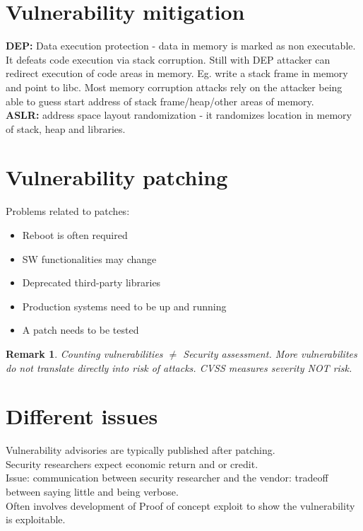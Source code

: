 \documentclass[10pt,a4paper]{book}
\newtheorem{remark}{Remark}
\begin{document}
\section{Vulnerability mitigation}
\textbf{DEP:} Data execution protection - data in memory is marked as non executable. It defeats code execution via stack corruption. Still with DEP attacker can redirect execution of code areas in memory. Eg. write a stack frame in memory and point to libc. Most memory corruption attacks rely on the attacker being able to guess start address of stack frame/heap/other areas of memory.\\
\textbf{ASLR:} address space layout randomization - it randomizes location in memory of stack, heap and libraries.
\section{Vulnerability patching}
Problems related to patches: 
\begin{itemize}
\item Reboot is often required
\item SW functionalities may change
\item Deprecated third-party libraries
\item Production systems need to be up and running
\item A patch needs to be tested
\end{itemize}
\begin{remark}
Counting vulnerabilities $\neq$ Security assessment. More vulnerabilites do not translate directly into risk of attacks. CVSS measures severity NOT risk.
\end{remark}
\section{Different issues}
Vulnerability advisories are typically published after patching.\\
Security researchers expect economic return and or credit.\\
Issue: communication between security researcher and the vendor: tradeoff between saying little and being verbose.\\
Often involves development of Proof of concept exploit to show the vulnerability is exploitable.
\end{document}
